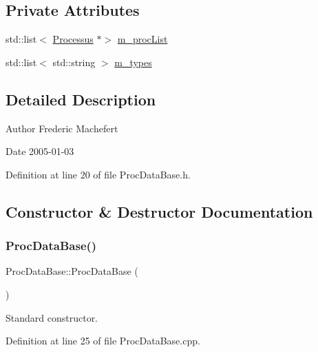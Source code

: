\subsection*{Private Attributes}
\begin{DoxyCompactItemize}
\item 
std\+::list$<$ \hyperlink{classProcessus}{Processus} $\ast$$>$ \hyperlink{classProcDataBase_a9b7458b811b826c5d264b436c7a391c4}{m\+\_\+proc\+List}
\item 
std\+::list$<$ std\+::string $>$ \hyperlink{classProcDataBase_a94063cebf50be9a12b8bd9f70e410ed5}{m\+\_\+types}
\end{DoxyCompactItemize}


\subsection{Detailed Description}
\begin{DoxyAuthor}{Author}
Frederic Machefert 
\end{DoxyAuthor}
\begin{DoxyDate}{Date}
2005-\/01-\/03 
\end{DoxyDate}


Definition at line 20 of file Proc\+Data\+Base.\+h.



\subsection{Constructor \& Destructor Documentation}
\mbox{\label{classProcDataBase_a82163dfca2df460ba2ea1559ffa72179}} 
\subsubsection{\texorpdfstring{Proc\+Data\+Base()}{ProcDataBase()}}
{\footnotesize\ttfamily Proc\+Data\+Base\+::\+Proc\+Data\+Base (\begin{DoxyParamCaption}{ }\end{DoxyParamCaption})}



Standard constructor. 



Definition at line 25 of file Proc\+Data\+Base.\+cpp.



